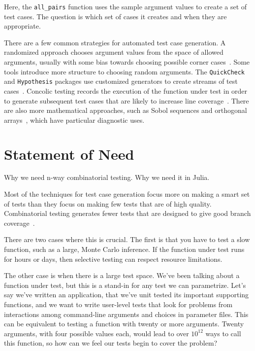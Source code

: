 \documentclass{juliacon}
\begin{document}
Here, the \verb|all_pairs| function uses the sample argument values to create a set of test cases. The question is which set of cases it creates and when they are appropriate.

\vskip 6pt
There are a few common strategies for automated test case generation. A randomized approach chooses argument values from the space of allowed arguments, usually with some bias towards choosing possible corner cases~\cite{Lampropoulos2020-sd,Arcuri2012-az}. Some tools introduce more structure to choosing random arguments. The \texttt{QuickCheck} and \texttt{Hypothesis} packages use customized generators to create streams of test cases~\cite{loscher2018automating}. Concolic testing records the execution of the function under test in order to generate subsequent test cases that are likely to increase line coverage~\cite{King1976-jt,Wang2018-xh}. There are also more mathematical approaches, such as Sobol sequences and orthogonal arrays~\cite{He2013-th}, which have particular diagnostic uses.


\section{Statement of Need}

Why we need n-way combinatorial testing. Why we need it in Julia.

\vskip 6pt
Most of the techniques for test case generation focus more on making a smart set of tests than they focus on making few tests that are of high quality. Combinatorial testing generates fewer tests that are designed to give good branch coverage~\cite{Nie2011-yl,Grindal2005-su,Kuhn2010-ak}.

\vskip 6pt
There are two cases where this is crucial. The first is that you have to test a slow function, such as a large, Monte Carlo inference. If the function under test runs for hours or days, then selective testing can respect resource limitations.

\vskip 6pt
The other case is when there is a large test space. We've been talking about a function under test, but this is a stand-in for any test we can parametrize. Let's say we've written an application, that we've unit tested its important supporting functions, and we want to write user-level tests that look for problems from interactions among command-line arguments and choices in parameter files. This can be equivalent to testing a function with twenty or more arguments. Twenty arguments, with four possible values each, would lead to over $10^{12}$ ways to call this function, so how can we feel our tests begin to cover the problem?
\end{document}

